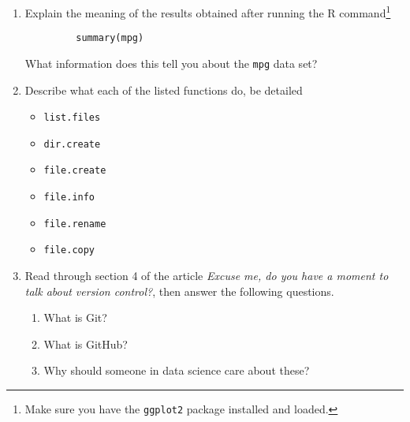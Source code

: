 \documentclass[12pt]{article}
\begin{document}
\begin{enumerate}
 \item Explain the meaning of the results obtained after running the R command\footnote{Make sure you have the {\tt ggplot2} package installed and loaded.}
     \begin{verbatim}
         summary(mpg)
     \end{verbatim}
     What information does this tell you about the {\tt mpg} data set?
     
     \item Describe what each of the listed functions do, be detailed
        \begin{itemize}
          \item {\tt  list.files}
          \item {\tt  dir.create}
          \item {\tt  file.create}
          \item {\tt  file.info}
          \item {\tt  file.rename}
          \item {\tt  file.copy}
        \end{itemize} 
    \item Read through section 4 of the article \emph{Excuse me, do you have a moment to talk
about version control?}, then answer the following questions. 
\begin{enumerate}
  \item What is Git?
  \item What is GitHub? 
  \item Why should someone in data science care about these? 
\end{enumerate} 
     
  \end{enumerate}
\end{document}
